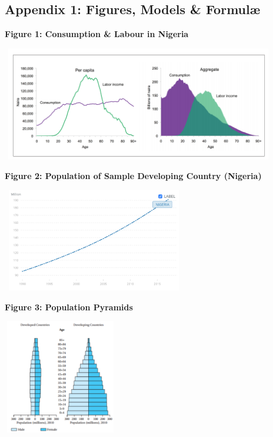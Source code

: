 \documentclass[11pt, english]{article}
\begin{document}
	\subsection{Appendix 1: Figures, Models \& Formul\ae}

	\textbf{Figure 1: Consumption \& Labour in Nigeria}

	\begin{center}
		\includegraphics[width=12cm,height=5cm]{BF201-IMG/1.png}
	\end{center}

	\textbf{Figure 2: Population of Sample Developing Country (Nigeria)}

        \begin{center}
                \includegraphics[width=8cm,height=4.5cm]{BF201-IMG/2.png}
        \end{center}

        \textbf{Figure 3: Population Pyramids}

        \begin{center}
                \includegraphics[width=5cm,height=5cm]{BF201-IMG/3.png}
        \end{center}
\end{document}
